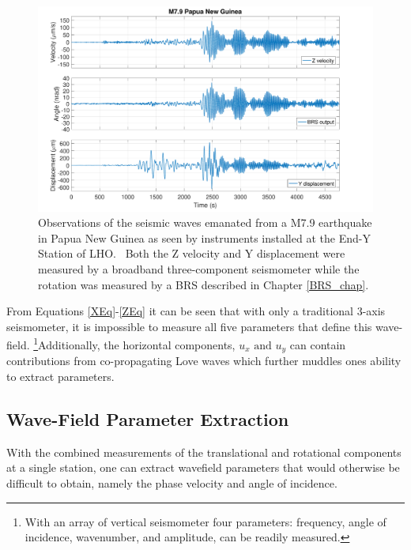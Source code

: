 \documentclass [12pt, proquest]{uwthesis}[2019]
\begin{document}
\begin{figure}%
\begin{center}
\includegraphics[width=\textwidth]{PNGTimeSeries.pdf}
\caption[Observations of the seismic waves by instruments installed at the End-Y Station of LHO]{Observations of the seismic waves emanated from a M7.9 earthquake in Papua New Guinea as seen by instruments installed at the End-Y Station of LHO.~\cite{tiltSeismology} Both the Z velocity and Y displacement were measured by a broadband three-component seismometer while the rotation was measured by a BRS described in Chapter \ref{BRS_chap}. }
\label{Earthquake}
\end{center}
\end{figure}

From Equations \ref{XEq}-\ref{ZEq} it can be seen that with only a traditional 3-axis seismometer, it is impossible to measure all five parameters that define this wave-field. \footnote{With an array of vertical seismometer four parameters: frequency, angle of incidence, wavenumber, and amplitude, can be readily measured.}Additionally, the horizontal components, $u_x\text{ and }u_y$ can contain contributions from co-propagating Love waves which further muddles ones ability to extract parameters. 


\subsection{Wave-Field Parameter Extraction}

With the combined measurements of the translational and rotational components at a single station, one can extract wavefield parameters that would otherwise be difficult to obtain, namely the phase velocity and angle of incidence. 
\end{document}
